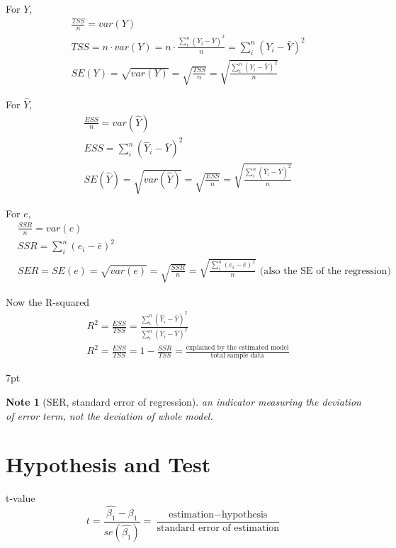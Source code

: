 \documentclass{article}
\newenvironment{blueblock}{
\def\FrameCommand{
  \hspace{1pt}
    {\color{DarkBlue}
    \vrule width 2pt}
    {\color{blueshade}
    \vrule width 4pt}
  \colorbox{blueshade}
}
\MakeFramed{
  \advance
  \hsize-
  \width
  \FrameRestore}
\noindent\hspace{-4.55pt}%
\begin{adjustwidth}{}{7pt}
\vspace{2pt}\vspace{2pt}
}
{\vspace{2pt}\end{adjustwidth}\endMakeFramed}
\newtheorem{note}{Note}
\begin{document}
For $Y$,
\begin{align}
&\frac{TSS}{n}=var(Y)
\\& TSS=n \cdot var(Y)=n \cdot \frac{\sum\limits_i^n (Y_i-\bar Y)^2}{n}=\sum\limits_i^n (Y_i-\bar Y)^2
\\& SE(Y)=\sqrt{var(Y)}=\sqrt{\frac{TSS}{n}}=\sqrt{\frac{\sum\limits_i^n (Y_i-\bar Y)^2}{n}}
\end{align}

For $\hat Y$,
\begin{align}
&\frac{ESS}{n}=var(\hat Y)
\\&ESS=\sum\limits_i^n (\hat Y_i-\bar Y)^2
\\&SE(\hat Y)=\sqrt{var(\hat Y)}=\sqrt{\frac{ESS}{n}}=\sqrt{\frac{\sum\limits_i^n (\hat Y_i-\bar Y)^2}{n}}
\end{align}

For $e$,
\begin{align}
&\frac{SSR}{n}=var(e)
\\&SSR=\sum\limits_i^n (e_i-\bar e)^2
\\&SER=SE(e)=\sqrt{var(e)}=\sqrt{\frac{SSR}{n}}=\sqrt{\frac{\sum\limits_i^n (e_i-\bar e)^2}{n}} \text{ (also the SE of the regression)}
\end{align}

Now the R-squared
\begin{align}
& R^2=\frac{ESS}{TSS}=\frac{\sum\limits_i^n (\hat Y_i-\bar Y)^2}{\sum\limits_i^n (Y_i-\bar Y)^2}
\\&R^2=\frac{ESS}{TSS}=1-\frac{SSR}{TSS}=\frac{\text{explained by the estimated model}}{\text{total sample data}}
\end{align}

\begin{blueblock}
\begin{note}[SER, standard error of regression]
an indicator measuring the deviation of error term, not the deviation of whole model.
\end{note}
\end{blueblock}


\section{Hypothesis and Test}

t-value
\begin{equation}
  t=\frac{\hat{\beta_{1}}-\beta_{1}}{se(\hat{\beta_{1}})}=\frac{\text{estimation}-\text{hypothesis}}{\text{standard error of estimation}}
\end{equation}
\end{document}
